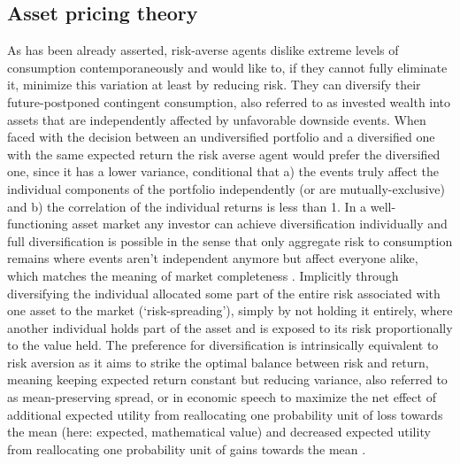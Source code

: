 \subsection{Asset pricing theory} \label{Asset pricing theory}
As has been already asserted, risk-averse agents dislike extreme levels of consumption contemporaneously and would like to, if they cannot fully eliminate it, minimize this variation at least by reducing risk. They can diversify their future-postponed contingent consumption, also referred to as invested wealth into assets that are independently affected by unfavorable downside events. When faced with the decision between an undiversified portfolio and a diversified one with the same expected return the risk averse agent would prefer the diversified one, since it has a lower variance, conditional that a) the events truly affect the individual components of the portfolio independently (or are mutually-exclusive) and b) the correlation of the individual returns is less than 1. In a well-functioning asset market any investor can achieve diversification individually and full diversification is possible in the sense that only aggregate risk to consumption remains where events aren't independent anymore but affect everyone alike, which matches the meaning of market completeness \cite{Constantinides2003}. Implicitly through diversifying the individual allocated some part of the entire risk associated with one asset to the market (`risk-spreading'), simply by not holding it entirely, where another individual holds part of the asset and is exposed to its risk proportionally to the value held. The preference for diversification is intrinsically equivalent to risk aversion as it aims to strike the optimal balance between risk and return, meaning keeping expected return constant but reducing variance, also referred to as mean-preserving spread, or in economic speech to maximize the net effect of additional expected utility from reallocating one probability unit of loss towards the mean (here: expected, mathematical value) and decreased expected utility from reallocating one probability unit of gains towards the mean \cite{Eeckhoudt2011}. 

